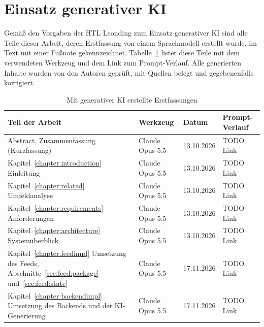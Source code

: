 \section*{Einsatz generativer KI}

Gemäß den Vorgaben der HTL Leonding zum Einsatz generativer KI sind alle Teile dieser Arbeit, deren Erstfassung von einem Sprachmodell erstellt wurde, im Text mit einer Fußnote gekennzeichnet.
Tabelle~\ref{tab:app:ki} listet diese Teile mit dem verwendeten Werkzeug und dem Link zum Prompt-Verlauf.
Alle generierten Inhalte wurden von den Autoren geprüft, mit Quellen belegt und gegebenenfalls korrigiert.


\begin{table}
    \centering
    \small
    \begin{tabularx}{\textwidth}{>{\raggedright\arraybackslash}X l l >{\raggedright\arraybackslash}X}
        \toprule
        \textbf{Teil der Arbeit} & \textbf{Werkzeug} & \textbf{Datum} & \textbf{Prompt-Verlauf} \\
        \midrule
        Abstract, Zusammenfassung (Kurzfassung) & Claude Opus 5.5 & 13.10.2026 & TODO Link \\
        Kapitel~\ref{chapter:introduction} Einleitung & Claude Opus 5.5 & 13.10.2026 & TODO Link \\
        Kapitel~\ref{chapter:related} Umfeldanalyse & Claude Opus 5.5 & 13.10.2026 & TODO Link \\
        Kapitel~\ref{chapter:requirements} Anforderungen & Claude Opus 5.5 & 13.10.2026 & TODO Link \\
        Kapitel~\ref{chapter:architecture} Systemüberblick & Claude Opus 5.5 & 13.10.2026 & TODO Link \\
        Kapitel~\ref{chapter:feedimpl} Umsetzung des Feeds, Abschnitte~\ref{sec:feed:package} und~\ref{sec:feed:state} & Claude Opus 5.5 & 17.11.2026 & TODO Link \\
        Kapitel~\ref{chapter:backendimpl} Umsetzung des Backends und der KI-Generierung & Claude Opus 5.5 & 17.11.2026 & TODO Link \\
        \bottomrule
    \end{tabularx}
    \caption{Mit generativer KI erstellte Erstfassungen}
    \label{tab:app:ki}
\end{table}
